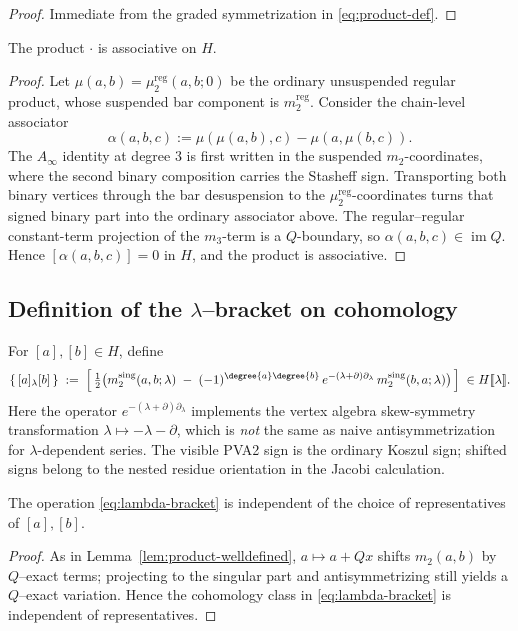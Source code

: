 \begin{proof}
Immediate from the graded symmetrization in \eqref{eq:product-def}.
\end{proof}

\begin{proposition}[Associativity on $H$]%
The product $\cdot$ is associative on $H$.
\end{proposition}

\begin{proof}
Let \(\mu(a,b)=\mu_2^{\mathrm{reg}}(a,b;0)\) be the ordinary
unsuspended regular product, whose suspended bar component is
\(m_2^{\mathrm{reg}}\).  Consider the chain-level associator
\[
\alpha(a,b,c):=\mu(\mu(a,b),c)-\mu(a,\mu(b,c)).
\]
The $A_\infty$ identity at degree $3$ is first written in the
suspended \(m_2\)-coordinates, where the second binary composition
carries the Stasheff sign.  Transporting both binary vertices through
the bar desuspension to the \(\mu_2^{\mathrm{reg}}\)-coordinates turns
that signed binary part into the ordinary associator above.  The
regular--regular constant-term projection of the \(m_3\)-term is a
\(Q\)-boundary, so \(\alpha(a,b,c)\in\operatorname{im}Q\).  Hence
\([\alpha(a,b,c)]=0\) in \(H\), and the product is associative.
\end{proof}
\subsection{Definition of the $\lambda$–bracket on cohomology}
\begin{definition}%
For $[a],[b]\in H$, define
\begin{equation}%
\{\, [a] {}_\lambda [b] \,\} \;:=\; \Big[\, \tfrac{1}{2}\big( m_2^{\mathrm{sing}}(a,b;\lambda) \;-\; (-1)^{\degree{a}\degree{b}}\, e^{-(\lambda+\partial)\partial_\lambda}\, m_2^{\mathrm{sing}}(b,a;\lambda)\big)\,\Big] \;\in H[\![\lambda]\!].
\end{equation}
Here the operator $e^{-(\lambda+\partial)\partial_\lambda}$ implements the vertex algebra skew-symmetry transformation $\lambda\mapsto -\lambda-\partial$, which is \emph{not} the same as naive antisymmetrization for $\lambda$-dependent series.  The visible PVA2 sign is the ordinary Koszul sign; shifted signs belong to the nested residue orientation in the Jacobi calculation.
\end{definition}
\begin{lemma}%
The operation \eqref{eq:lambda-bracket} is independent of the choice of representatives of $[a],[b]$.
\end{lemma}
\begin{proof}
As in Lemma~\ref{lem:product-welldefined}, $a\mapsto a+Qx$ shifts $m_2(a,b)$ by $Q$–exact terms; projecting to the singular part and antisymmetrizing still yields a $Q$–exact variation. Hence the cohomology class in \eqref{eq:lambda-bracket} is independent of representatives.
\end{proof}

